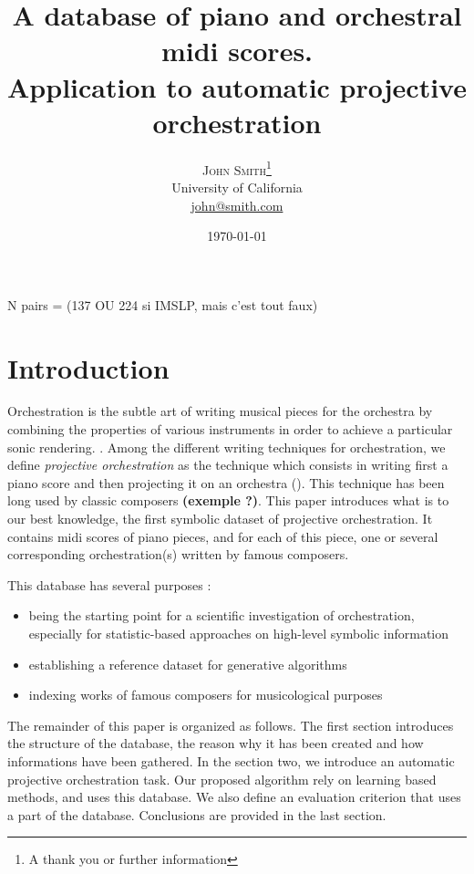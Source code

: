 \documentclass[twoside,twocolumn]{article}
\title{A database of piano and orchestral midi scores.\\Application to automatic projective orchestration} %
\author{%
\textsc{John Smith}\thanks{A thank you or further information} \\[1ex] %
\normalsize University of California \\ %
\normalsize \href{mailto:john@smith.com}{john@smith.com} %
}
\date{\today} %
\begin{document}
\maketitle


N pairs = (137 OU 224 si IMSLP, mais c'est tout faux)



\section{Introduction}
Orchestration is the subtle art of writing musical pieces for the orchestra by combining the properties of various instruments in order to achieve a particular sonic rendering. \cite{koechli_orch,Rimsky-Korsakov:1873aa}. 
Among the different writing techniques for orchestration, we define \textit{projective orchestration} as the technique which consists in writing first a piano score and then projecting it on an orchestra (). This technique has been long used by classic composers \textbf{(exemple ?)}.
This paper introduces what is to our best knowledge, the first symbolic dataset of projective orchestration.
It contains midi scores of piano pieces, and for each of this piece, one or several corresponding orchestration(s) written by famous composers.

This database has several purposes :
\begin{itemize}
\item being the starting point for a scientific investigation of orchestration, especially for statistic-based approaches on high-level symbolic information
\item establishing a reference dataset for generative algorithms 
\item indexing works of famous composers for musicological purposes
\end{itemize}

The remainder of this paper is organized as follows. The first section introduces the structure of the database, the reason why it has been created and how informations have been gathered. In the section two, we introduce an automatic projective orchestration task. Our proposed algorithm rely on learning based methods, and uses this database. We also define an evaluation criterion that uses a part of the database. Conclusions are provided in the last section.
\end{document}
